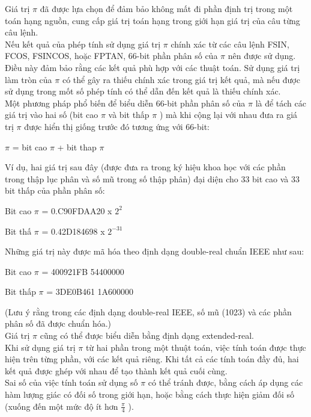 		Giá trị $\pi$ đã được lựa chọn để đảm bảo không mất đi phần định trị trong một toán hạng nguồn, cung cấp giá trị toán hạng trong giới hạn giá trị của câu từng câu lệnh.\\
		
		Nếu kết quả của phép tính sử dụng giá trị $\pi$ chính xác từ các câu lệnh FSIN, FCOS, FSINCOS, hoặc FPTAN, 66-bit phần phân số của  $\pi$ nên được sử dụng. Điều này đảm bảo rằng các kết quả phù hợp với các thuật toán. Sử dụng giá trị làm tròn của $\pi$  có thể gây ra thiếu chính xác trong giá trị kết quả, mà nếu được sử dụng trong mốt số phép tính có thể dẫn đến kết quả là thiếu chính xác.\\
		
		Một phương pháp phổ biến để biểu diễn 66-bit phần phân số của   $\pi$ là để tách các giá trị vào hai số (bit cao  $\pi$  và bit thấp  $\pi$ ) mà khi cộng lại với nhau đưa ra giá trị  $\pi$ được hiển thị giống trước đó tương ứng với 66-bit:
		
		
		 $\pi$  = bit cao $\pi$  + bit thap  $\pi$ 


		Ví dụ, hai giá trị sau đây (được đưa ra trong ký hiệu khoa học với các phần trong thập lục phân và số mũ trong số thập phân) đại diện cho 33 bit cao và 33 bit thấp của phần phân số:
		
		
		Bit cao  $\pi$  = 0.C90FDAA20 x $2^{ 2}$


		Bit thấ  $\pi$  = 0.42D184698 x $2^{-31}$


		Những giá trị này được mã hóa theo định dạng double-real chuẩn IEEE như sau:
		
		
		Bit cao  $\pi$  = 400921FB 54400000


		Bit thấp  $\pi$ = 3DE0B461 1A600000
		
		
		(Lưu ý rằng trong các định dạng double-real IEEE, số mũ (1023) và các phần phân số đã được chuẩn hóa.) \\
		
		Giá trị  $\pi$  cũng có thể được biểu diễn bằng định dạng extended-real. \\


		Khi sử dụng giá trị  $\pi$ từ hai phần trong một thuật toán, việc tính toán được thực hiện trên từng phần, với các kết quả riêng. Khi tất cả các tính toán đầy đủ, hai kết quả được ghép với nhau để tạo thành kết quả cuối cùng.\\
		
		Sai số của việc tính toán sử dụng số  $\pi$  có thể tránh được, bằng cách áp dụng các hàm lượng giác có đối số trong giới hạn, hoặc bằng cách thực hiện giảm đối số (xuống đến một mức độ ít hơn  $\frac{\pi}{4}$ ).
		
